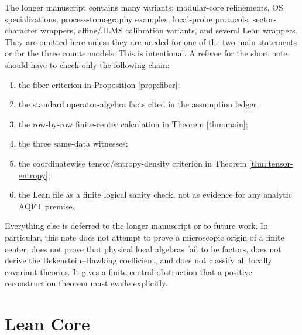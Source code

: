 \documentclass[12pt]{article}
\theoremstyle{definition}
\theoremstyle{remark}
\begin{document}
The longer manuscript contains many variants: modular-core refinements, OS
specializations, process-tomography examples, local-probe protocols,
sector-character wrappers, affine/JLMS calibration variants, and several Lean
wrappers.  They are omitted here unless they are needed for one of the two main
statements or for the three countermodels.  This is intentional.  A referee for
the short note should have to check only the following chain:
\begin{enumerate}
\item the fiber criterion in Proposition \ref{prop:fiber};
\item the standard operator-algebra facts cited in the assumption ledger;
\item the row-by-row finite-center calculation in Theorem \ref{thm:main};
\item the three same-data witnesses;
\item the coordinatewise tensor/entropy-density criterion in Theorem
      \ref{thm:tensor-entropy};
\item the Lean file as a finite logical sanity check, not as evidence for any
      analytic AQFT premise.
\end{enumerate}
Everything else is deferred to the longer manuscript or to future work.  In
particular, this note does not attempt to prove a microscopic origin of a
finite center, does not prove that physical local algebras fail to be factors,
does not derive the Bekenstein--Hawking coefficient, and does not classify all
locally covariant theories.  It gives a finite-central obstruction that a
positive reconstruction theorem must evade explicitly.

\section{Lean Core}
\end{document}
